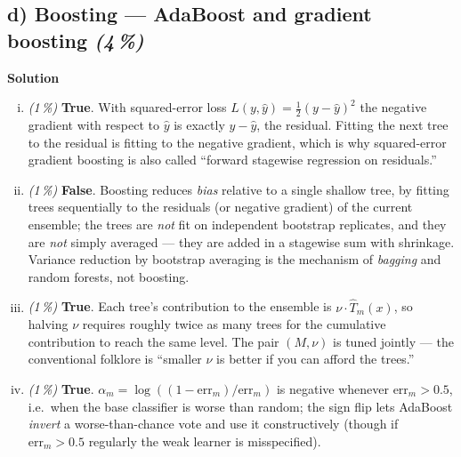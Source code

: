 \documentclass[11pt,a4paper]{article}
\newcommand{\subpoints}[1]{\textit{(#1\,\%)}}
\newcommand{\sol}{\noindent\textbf{Solution}}
\begin{document}
\subsection*{d) Boosting --- AdaBoost and gradient boosting \subpoints{4}}
\sol{}
\begin{enumerate}[(i)]
  \item \subpoints{1} \textbf{True}. With squared-error loss $L(y,\hat y)=\tfrac{1}{2}(y-\hat y)^2$
        the negative gradient with respect to $\hat y$ is exactly $y-\hat y$, the residual. Fitting
        the next tree to the residual is fitting to the negative gradient, which is why squared-error
        gradient boosting is also called ``forward stagewise regression on residuals.''
  \item \subpoints{1} \textbf{False}. Boosting reduces \emph{bias} relative to a single shallow
        tree, by fitting trees sequentially to the residuals (or negative gradient) of the current
        ensemble; the trees are \emph{not} fit on independent bootstrap replicates, and they are
        \emph{not} simply averaged --- they are added in a stagewise sum with shrinkage. Variance
        reduction by bootstrap averaging is the mechanism of \emph{bagging} and random forests,
        not boosting.
  \item \subpoints{1} \textbf{True}. Each tree's contribution to the ensemble is $\nu\cdot\hat T_m(x)$,
        so halving $\nu$ requires roughly twice as many trees for the cumulative contribution to
        reach the same level. The pair $(M,\nu)$ is tuned jointly --- the conventional folklore is
        ``smaller $\nu$ is better if you can afford the trees.''
  \item \subpoints{1} \textbf{True}. $\alpha_m = \log((1-\mathrm{err}_m)/\mathrm{err}_m)$ is negative
        whenever $\mathrm{err}_m > 0.5$, i.e.\ when the base classifier is worse than random; the
        sign flip lets AdaBoost \emph{invert} a worse-than-chance vote and use it constructively
        (though if $\mathrm{err}_m > 0.5$ regularly the weak learner is misspecified).
\end{enumerate}
\end{document}
